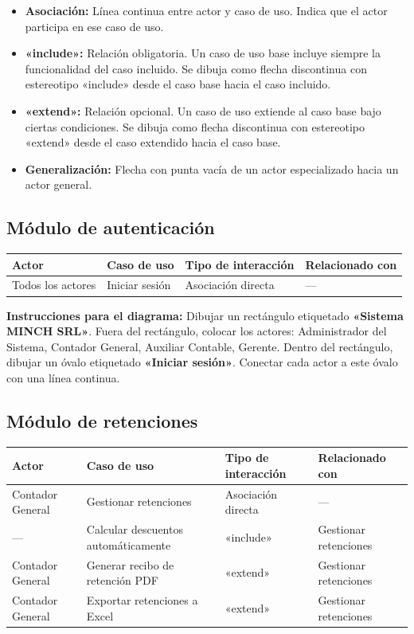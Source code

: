 \documentclass[stu]{apa7}
\begin{document}
\begin{itemize}
    \item \textbf{Asociación:} Línea continua entre actor y caso de uso. Indica que el actor participa en ese caso de uso.
    \item \textbf{«include»:} Relación obligatoria. Un caso de uso base incluye siempre la funcionalidad del caso incluido. Se dibuja como flecha discontinua con estereotipo «include» desde el caso base hacia el caso incluido.
    \item \textbf{«extend»:} Relación opcional. Un caso de uso extiende al caso base bajo ciertas condiciones. Se dibuja como flecha discontinua con estereotipo «extend» desde el caso extendido hacia el caso base.
    \item \textbf{Generalización:} Flecha con punta vacía de un actor especializado hacia un actor general.
\end{itemize}

\subsection{Módulo de autenticación}

\begin{longtable}{|L{3cm}|L{4cm}|L{4cm}|L{4cm}|}
\hline
{}
\textbf{Actor} & \textbf{Caso de uso} & \textbf{Tipo de interacción} & \textbf{Relacionado con} \\
\hline
\endhead
Todos los actores & Iniciar sesión & Asociación directa & --- \\
\hline
\end{longtable}

\textbf{Instrucciones para el diagrama:}
Dibujar un rectángulo etiquetado \textbf{«Sistema MINCH SRL»}. Fuera del rectángulo, colocar los actores: Administrador del Sistema, Contador General, Auxiliar Contable, Gerente. Dentro del rectángulo, dibujar un óvalo etiquetado \textbf{«Iniciar sesión»}. Conectar cada actor a este óvalo con una línea continua.

\subsection{Módulo de retenciones}

\begin{longtable}{|L{3cm}|L{5cm}|L{4cm}|L{3cm}|}
\hline
{}
\textbf{Actor} & \textbf{Caso de uso} & \textbf{Tipo de interacción} & \textbf{Relacionado con} \\
\hline
\endhead
Contador General & Gestionar retenciones & Asociación directa & --- \\
\hline
--- & Calcular descuentos automáticamente & «include» & Gestionar retenciones \\
\hline
Contador General & Generar recibo de retención PDF & «extend» & Gestionar retenciones \\
\hline
Contador General & Exportar retenciones a Excel & «extend» & Gestionar retenciones \\
\hline
\end{longtable}
\end{document}
